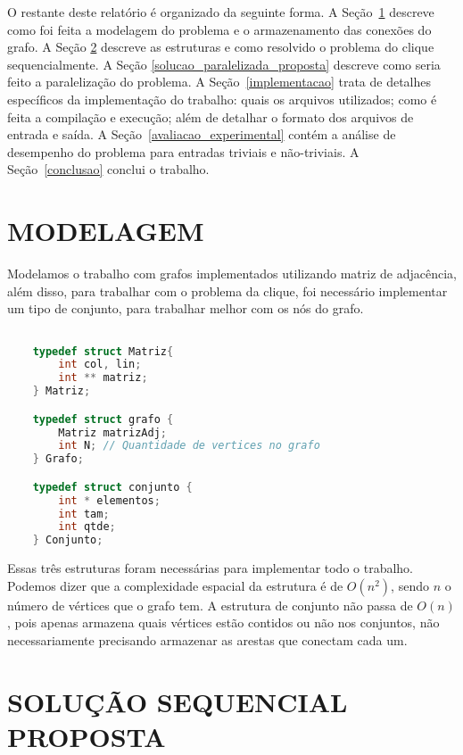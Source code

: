 \documentclass[12pt]{article}
\begin{document}
	O restante deste relatório é organizado da seguinte forma. A Seção~\ref{modelagem} descreve como foi feita a modelagem do problema e o armazenamento das conexões do grafo. A Seção \ref{solucao_sequencial_proposta} descreve as estruturas e como resolvido o problema do clique sequencialmente. A Seção \ref{solucao_paralelizada_proposta} descreve como seria feito a paralelização do problema. A Seção~\ref{implementacao} trata de detalhes específicos da implementação do trabalho: quais os arquivos utilizados; como é feita a compilação e execução; além de detalhar o formato dos arquivos de entrada e saída. A Seção~\ref{avaliacao_experimental} contém a análise de desempenho do problema para entradas triviais e não-triviais. A Seção~\ref{conclusao} conclui o trabalho.


\section{MODELAGEM}
\label{modelagem}

    Modelamos o trabalho com grafos implementados utilizando matriz de adjacência, além disso, para trabalhar com o problema da clique, foi necessário implementar um tipo de conjunto, para trabalhar melhor com os nós do grafo.

    \begin{lstlisting}[language=c]

    typedef struct Matriz{
        int col, lin;
        int ** matriz;
    } Matriz;

    typedef struct grafo {
        Matriz matrizAdj;
        int N; // Quantidade de vertices no grafo
    } Grafo;

    typedef struct conjunto {
        int * elementos;
        int tam;
        int qtde;
    } Conjunto;

    \end{lstlisting}

    Essas três estruturas foram necessárias para implementar todo o trabalho. Podemos dizer que a complexidade espacial da estrutura é de $O(n^2)$, sendo $n$ o número de vértices que o grafo tem. A estrutura de conjunto não passa de $O(n)$, pois apenas armazena quais vértices estão contidos ou não nos conjuntos, não necessariamente precisando armazenar as arestas que conectam cada um.


\section{SOLUÇÃO SEQUENCIAL PROPOSTA}
\label{solucao_sequencial_proposta}
\end{document}
